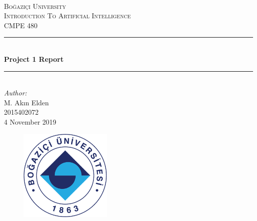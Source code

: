 \documentclass[12pt]{article}
\begin{document}
\begin{titlepage}

\newcommand{\HRule}{\rule{\linewidth}{0.5mm}} 							%
\center 
\\
\textsc{\LARGE Boğaziçi University}\\[1cm]

\textsc{\Large Introduction To Artificial Intelligence}\\[0.2cm]
\textsc{\large CMPE 480}\\[1cm] 										%
\HRule \\[0.8cm]
{ \huge \bfseries Project 1 Report}\\[0.7cm]								%
\HRule \\[2cm]
\large
\emph{Author:}\\
 M. Akın Elden\\2015402072\\[1.5cm]													%
{\large 4 November 2019}\\[3cm]
\begin{figure}[h]
    \centering
    \includegraphics[height=12em]{boun_logo.png}
    
\end{figure}
\end{titlepage}


\onehalfspacing
\end{document}
